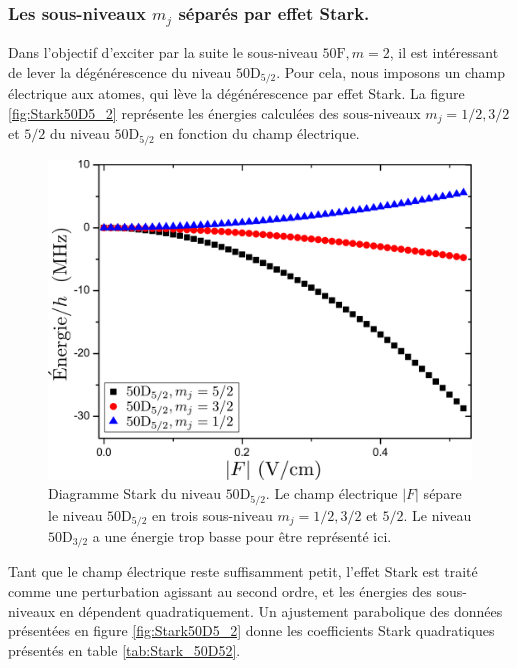 		\subsubsection*{Les sous-niveaux $m_j$ séparés par effet Stark.}
\noindent Dans l'objectif d'exciter par la suite le sous-niveau $\mathrm{50F},m=2$, il est intéressant de lever la dégénérescence du niveau $\mathrm{50D}_{5/2}$.
Pour cela, nous imposons un champ électrique aux atomes, qui lève la dégénérescence par effet Stark.
La figure \eqref{fig:Stark50D5_2} représente les énergies calculées des sous-niveaux $m_j=1/2,3/2$ et $5/2$ du niveau $\mathrm{50D}_{5/2}$ en fonction du champ électrique.
%
\begin{figure}[!h]
\centering
\includegraphics[width=0.7\linewidth]{figures/circulars/Stark50D5_2}
\caption[Diagramme Stark du niveau $\mathrm{50D_{5/2}}$]{
Diagramme Stark du niveau $\mathrm{50D_{5/2}}$.
Le champ électrique $|F|$ sépare le niveau $\mathrm{50D_{5/2}}$ en trois sous-niveau $m_j=1/2,3/2$ et $5/2$.
Le niveau $\mathrm{50D_{3/2}}$ a une énergie trop basse pour être représenté ici.
}
\label{fig:Stark50D5_2}
\end{figure}
%
Tant que le champ électrique reste suffisamment petit, l'effet Stark est traité comme une perturbation agissant au second ordre, et les énergies des sous-niveaux en dépendent quadratiquement.
Un ajustement parabolique des données présentées en figure \eqref{fig:Stark50D5_2} donne les coefficients Stark quadratiques présentés en table \eqref{tab:Stark_50D52}.

